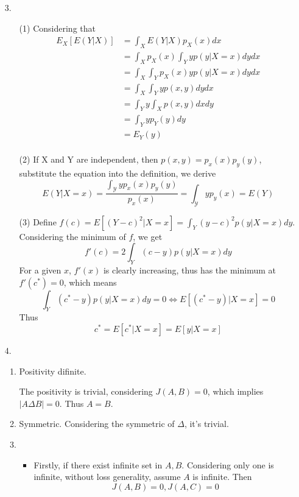 \documentclass{article}
\begin{document}
\begin{enumerate}
\item[3.]
\begin{enumerate}
    \item[(1)] Considering that
    \begin{align*}
        E_X[E(Y | X)] &= \int_{X}E(Y | X)p_X(x) dx\\
        &= \int_{X} p_X(x) \int_{Y} y p(y | X = x) dy dx\\
        &= \int_{X} \int_{Y} p_X(x) y p(y | X = x)dydx\\
        &= \int_{X} \int_{Y} y p(x, y)dydx\\
        &= \int_{Y} y \int_{X} p(x, y) dxdy\\
        &= \int_{Y} y p_Y(y) dy\\
        &= E_Y(y)\\
    \end{align*}
    \item[(2)] If X and Y are independent, then \(p(x, y) = p_x(x)p_y(y)\), substitute the equation into the definition, we derive
    \[E(Y | X = x) = \frac{\int_{\mathcal Y}y p_x(x)p_y(y)}{p_x(x)} = \int_{\mathcal Y} y p_y(x) = E(Y)\]
    \item[(3)] Define \(f(c) = E[{(Y - c)}^2 | X = x] = \int_Y {(y - c)}^2 p(y | X = x) dy\). Considering the minimum of \(f\), we get
    \[f'(c) = 2\int_Y (c - y) p(y | X = x)dy\]
    For a given \(x\), \(f'(x)\) is clearly increasing, thus has the minimum at \(f'(c^*) = 0\), which means
    \[\int_Y (c^* - y) p(y | X = x)dy = 0 \iff E[(c^* - y) | X = x] = 0\]
    Thus
    \[c^* = E[c^* | X = x] = E[y | X = x]\]
\end{enumerate}

\item[4.]
    \begin{enumerate}
        \item Positivity difinite.
        
        The positivity is trivial, considering \(J(A, B) = 0\), which implies \(|A \Delta B| = 0\). Thus \(A = B\).

        \item Symmetric. Considering the symmetric of \(\Delta\), it's trivial.
        
        \item 
        \begin{itemize}
            \item 
            Firstly, if there exist infinite set in \(A, B\). Considering only one is infinite, without loss generality, assume \(A\) is infinite. Then
            \[J(A, B) = 0, J(A, C) = 0\]
    

\end{itemize}
\end{enumerate}
\end{enumerate}
\end{document}

